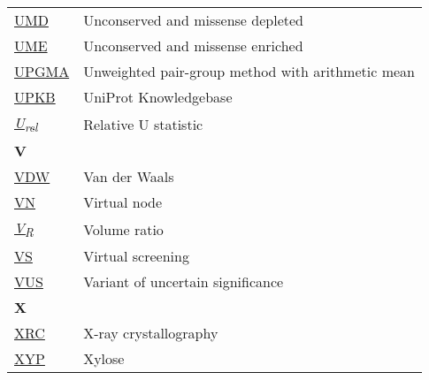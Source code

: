 \begin{longtable}[l]{@{}p{2.5cm}p{12cm}@{}}
\textmd{\href{https://www.nature.com/articles/s42003-024-06117-5}{UMD}} & Unconserved and missense depleted \\
\textmd{\href{https://www.nature.com/articles/s42003-024-06117-5}{UME}} & Unconserved and missense enriched \\
\textmd{\href{https://en.wikipedia.org/wiki/UPGMA}{UPGMA}} & Unweighted pair-group method with arithmetic mean \\
\textmd{\href{https://www.uniprot.org/help/uniprotkb}{UPKB}} & UniProt Knowledgebase \\
\textmd{\href{https://www.nature.com/articles/s42003-024-05970-8}{\textit{U\textsubscript{rel}}}} & Relative U statistic \\[0.3175cm]
\newpage
\textbf{\large V} & \\[0.25cm]
\textmd{\href{https://en.wikipedia.org/wiki/Van_der_Waals_force}{VDW}} & Van der Waals \\
\textmd{\href{https://arxiv.org/abs/2404.07194}{VN}} & Virtual node \\
\textmd{\href{https://jcheminf.biomedcentral.com/articles/10.1186/s13321-024-00923-z}{\textit{V\textsubscript{R}}}} & Volume ratio \\
\textmd{\href{https://en.wikipedia.org/wiki/Virtual_screening}{VS}} & Virtual screening \\
\textmd{\href{https://en.wikipedia.org/wiki/Variant_of_uncertain_significance}{VUS}} & Variant of uncertain significance \\[0.3175cm]
\textbf{\large X} & \\[0.25cm]
\textmd{\href{https://en.wikipedia.org/wiki/X-ray_crystallography}{XRC}} & X-ray crystallography \\
\textmd{\href{https://www.ebi.ac.uk/pdbe-srv/pdbechem/chemicalCompound/show/XYP}{XYP}} & Xylose \\[0.3175cm]

\end{longtable}
